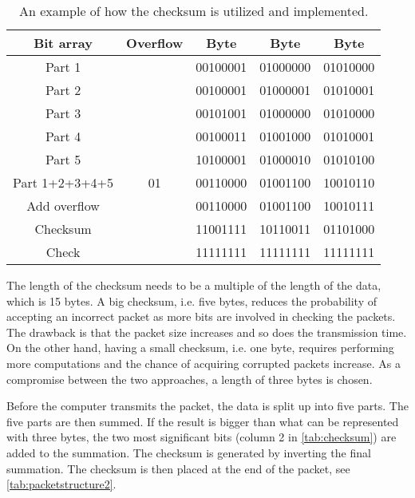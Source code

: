 \begin{table}[H]
\centering
\begin{tabular}{|c|c|c|c|c|}
\hline
Bit array      & Overflow   & Byte 	   & Byte 	  & Byte		 \\ \hline
Part 1         & 		    & 00100001 & 01000000 & 01010000    \\ \hline
Part 2         & 		    & 00100001 & 01000001 & 01010001    \\ \hline
Part 3         & 		    & 00101001 & 01000000 & 01010000    \\ \hline
Part 4         & 		    & 00100011 & 01001000 & 01010001    \\ \hline
Part 5         & 		    & 10100001 & 01000010 & 01010100    \\ \hline
Part 1+2+3+4+5 & 01	        & 00110000 & 01001100 & 10010110 	 \\ \hline
Add overflow   & 		    & 00110000 & 01001100 & 10010111    \\ \hline
Checksum       & 		    & 11001111 & 10110011 & 01101000    \\ \hline
Check          & 		    & 11111111 & 11111111 & 11111111    \\ \hline
\end{tabular}
\caption{An example of how the checksum is utilized and implemented.}
\label{tab:checksum}
\end{table}
The length of the checksum needs to be a multiple of the length of the data, which is 15 bytes. A big checksum, i.e. five bytes, reduces the probability of accepting an incorrect packet as more bits are involved in checking the packets. The drawback is that the packet size increases and so does the transmission time. On the other hand, having a small checksum, i.e. one byte, requires performing more computations and the chance of acquiring corrupted packets increase. As a compromise between the two approaches, a length of three bytes is chosen.

Before the computer transmits the packet, the data is split up into five parts. The five parts are then summed. If the result is bigger than what can be represented with three bytes, the two most significant bits (column 2 in \autoref{tab:checksum}) are added to the summation. The checksum is generated by inverting the final summation. The checksum is then placed at the end of the packet, see \autoref{tab:packetstructure2}.

